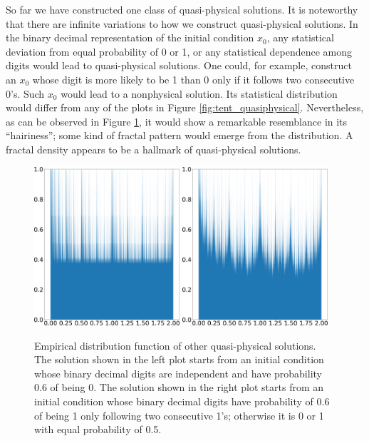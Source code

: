 So far we have constructed one class of quasi-physical solutions.
It is noteworthy that there are infinite variations to how we
construct quasi-physical solutions.  In the binary decimal
representation of the initial condition $x_0$, any statistical
deviation from equal probability of 0 or 1, or any statistical
dependence among digits would lead to quasi-physical solutions.
One could, for example, construct an $x_0$ whose digit is
more likely to be 1 than 0 only if it follows two consecutive 0's.
Such $x_0$ would lead to a nonphysical solution.  Its statistical
distribution would differ from any of the plots in Figure
\ref{fig:tent_quasiphysical}.  Nevertheless, as can be
observed in Figure \ref{fig:tent_alternative}, it would show
a remarkable resemblance in its ``hairiness''; some kind of fractal
pattern would emerge from the distribution.  A fractal density
appears to be a hallmark of quasi-physical solutions.
\begin{figure}[H]\centering
    \centering
    \includegraphics[width=0.48\textwidth]{figure/tent_quasiphysical_alternaive1_hist_p_0.6.png}
    \hspace{0.02\textwidth}
    \includegraphics[width=0.48\textwidth]{figure/tent_quasiphysical_alternaive2_hist_p_0.6.png}
    \caption{Empirical distribution function of other quasi-physical solutions.
    The solution shown in the left plot starts from an initial condition
    whose binary decimal digits are independent and have probability 0.6 of being 0.
    The solution shown in the right plot starts from an initial condition
    whose binary decimal digits have probability of 0.6 of being 1 only following two
    consecutive 1's; otherwise it is 0 or 1 with equal probability of 0.5.}
    \label{fig:tent_alternative}
\end{figure}

